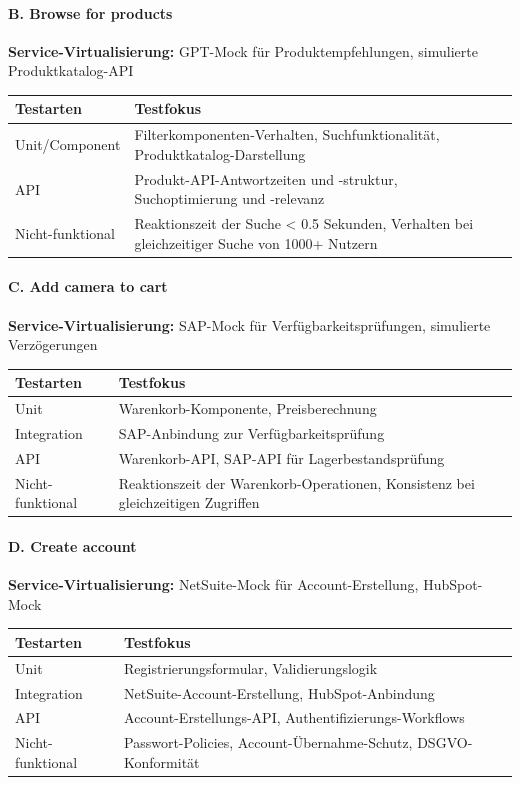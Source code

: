 \paragraph{B. Browse for products\\}
\textbf{Service-Virtualisierung:} GPT-Mock für Produktempfehlungen, simulierte Produktkatalog-API \\
\begin{tabular}{|p{3cm}|p{12cm}|}
\hline
\textbf{Testarten} & \textbf{Testfokus} \\
\hline
Unit/Component & Filterkomponenten-Verhalten, Suchfunktionalität, Produktkatalog-Darstellung \\
\hline
API & Produkt-API-Antwortzeiten und -struktur, Suchoptimierung und -relevanz \\
\hline
Nicht-funktional & Reaktionszeit der Suche < 0.5 Sekunden, Verhalten bei gleichzeitiger Suche von 1000+ Nutzern \\
\hline
\end{tabular}


\paragraph{C. Add camera to cart \\}
\textbf{Service-Virtualisierung:} SAP-Mock für Verfügbarkeitsprüfungen, simulierte Verzögerungen \\
\begin{tabular}{|p{3cm}|p{12cm}|}
\hline
\textbf{Testarten} & \textbf{Testfokus} \\
\hline
Unit & Warenkorb-Komponente, Preisberechnung \\
\hline
Integration & SAP-Anbindung zur Verfügbarkeitsprüfung \\
\hline
API & Warenkorb-API, SAP-API für Lagerbestandsprüfung \\
\hline
Nicht-funktional & Reaktionszeit der Warenkorb-Operationen, Konsistenz bei gleichzeitigen Zugriffen \\
\hline
\end{tabular}


\paragraph{D. Create account\\}
\textbf{Service-Virtualisierung:} NetSuite-Mock für Account-Erstellung, HubSpot-Mock\\
\begin{tabular}{|p{3cm}|p{12cm}|}
\hline
\textbf{Testarten} & \textbf{Testfokus} \\
\hline
Unit & Registrierungsformular, Validierungslogik \\
\hline
Integration & NetSuite-Account-Erstellung, HubSpot-Anbindung \\
\hline
API & Account-Erstellungs-API, Authentifizierungs-Workflows \\
\hline
Nicht-funktional & Passwort-Policies, Account-Übernahme-Schutz, DSGVO-Konformität \\
\hline
\end{tabular}


